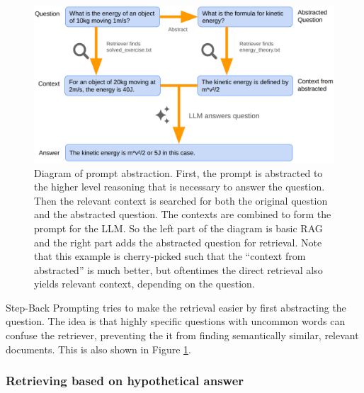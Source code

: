 \begin{figure}[h]
	\centering
	\includegraphics[width=0.9\linewidth]{fig/rag_abstract_prompt.png}
	\caption{Diagram of prompt abstraction. First, the prompt is abstracted to the higher level reasoning that is necessary to answer the question. Then the relevant context is searched for both the original question and the abstracted question. The contexts are combined to form the prompt for the LLM. So the left part of the diagram is basic RAG and the right part adds the abstracted question for retrieval. Note that this example is cherry-picked such that the ``context from abstracted'' is much better, but oftentimes the direct retrieval also yields relevant context, depending on the question.}
	\label{fig:rag_abstract_prompt}
\end{figure}

Step-Back Prompting \cite{zheng2023takeastepback} tries to make the retrieval easier by first abstracting the question. The idea is that highly specific questions with uncommon words can confuse the retriever, preventing the it from finding semantically similar, relevant documents. This is also shown in Figure \ref{fig:rag_abstract_prompt}.

\subsubsection{Retrieving based on hypothetical answer}

